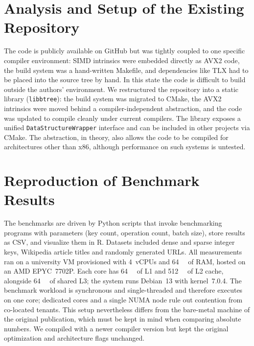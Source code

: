\documentclass[conference]{IEEEtran}
\begin{document}
\section{Analysis and Setup of the Existing Repository}

The code is publicly available on GitHub but was tightly coupled to one specific compiler
environment: SIMD intrinsics were embedded directly as AVX2 code, the build system was a
hand-written Makefile, and dependencies like TLX had to be placed into the source tree by hand.
In this state the code is difficult to build outside the authors' environment.
We restructured the repository into a static library (\texttt{libbtree}): the build system
was migrated to CMake, the AVX2 intrinsics were moved behind a compiler-independent
abstraction, and the code was updated to compile cleanly under current compilers.
The library exposes a unified \texttt{DataStructureWrapper} interface and can be included
in other projects via CMake. The abstraction, in theory, also allows the code to be compiled for
architectures other than x86, although performance on such systems is untested.

\section{Reproduction of Benchmark Results}

The benchmarks are driven by Python scripts that invoke benchmarking programs with
parameters (key count, operation count, batch size), store results as CSV, and visualize
them in R. Datasets included dense and sparse integer keys, Wikipedia article titles and
randomly generated URLs. All measurements ran on a university VM provisioned with
4~vCPUs and \SI{64}{\giga\byte} of RAM, hosted on an AMD EPYC~7702P. Each core has
\SI{64}{\kibi\byte} of L1 and \SI{512}{\kibi\byte} of L2 cache, alongside
\SI{64}{\mebi\byte} of shared L3; the system runs Debian~13 with kernel~7.0.4.
The benchmark workload is synchronous and single-threaded and therefore executes on one
core; dedicated cores and a single NUMA node rule out contention from co-located tenants.
This setup nevertheless differs from the bare-metal machine of the original publication,
which must be kept in mind when comparing absolute numbers. We compiled with a newer
compiler version but kept the original optimization and architecture flags unchanged.
\end{document}
